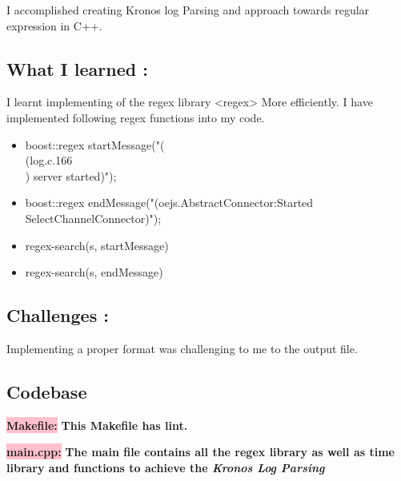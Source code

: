 I accomplished creating Kronos log Parsing and approach towards regular expression in C++.

\subsection{What I learned :}

I learnt implementing of the regex library <regex> More efficiently.\newline
I have implemented following regex functions into my code. \newline
\begin{itemize}
    \item boost::regex startMessage("( \\(log.c.166\\) server started)");
    \item boost::regex endMessage("(oejs.AbstractConnector:Started SelectChannelConnector)");
    \item regex-search(s, startMessage)
   \item  regex-search(s, endMessage)
\end{itemize}

\subsection{Challenges :}

Implementing a proper format was challenging to me to the output file.

\subsection{Codebase}\label{sec:ps7:code}

\textbf{\colorbox{pink}{Makefile:}} \newline \textbf{This Makefile has lint.}


\textbf{\colorbox{pink}{main.cpp:}} \newline \textbf{The main file contains all the regex library as well as time library and functions to achieve the \textit{Kronos Log Parsing}}



